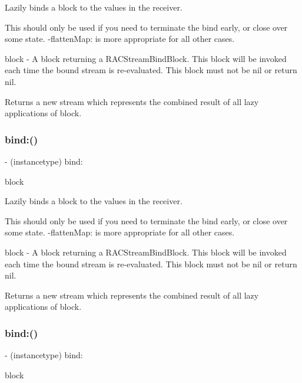 Lazily binds a block to the values in the receiver.

This should only be used if you need to terminate the bind early, or close over some state. -\/flatten\+Map\+: is more appropriate for all other cases.

block -\/ A block returning a R\+A\+C\+Stream\+Bind\+Block. This block will be invoked each time the bound stream is re-\/evaluated. This block must not be nil or return nil.

Returns a new stream which represents the combined result of all lazy applications of {\ttfamily block}. \mbox{\label{interface_r_a_c_stream_a8638bfba1497aa1b14b098857b4c62e2}} 
\subsubsection{\texorpdfstring{bind\+:()}{bind:()}\hspace{0.1cm}{\footnotesize\ttfamily [2/3]}}
{\footnotesize\ttfamily -\/ (instancetype) bind\+: \begin{DoxyParamCaption}\item[{(R\+A\+C\+Stream\+Bind\+Block($^\wedge$)(void))}]{block }\end{DoxyParamCaption}}

Lazily binds a block to the values in the receiver.

This should only be used if you need to terminate the bind early, or close over some state. -\/flatten\+Map\+: is more appropriate for all other cases.

block -\/ A block returning a R\+A\+C\+Stream\+Bind\+Block. This block will be invoked each time the bound stream is re-\/evaluated. This block must not be nil or return nil.

Returns a new stream which represents the combined result of all lazy applications of {\ttfamily block}. \mbox{\label{interface_r_a_c_stream_a8638bfba1497aa1b14b098857b4c62e2}} 
\subsubsection{\texorpdfstring{bind\+:()}{bind:()}\hspace{0.1cm}{\footnotesize\ttfamily [3/3]}}
{\footnotesize\ttfamily -\/ (instancetype) bind\+: \begin{DoxyParamCaption}\item[{(R\+A\+C\+Stream\+Bind\+Block($^\wedge$)(void))}]{block }\end{DoxyParamCaption}}

